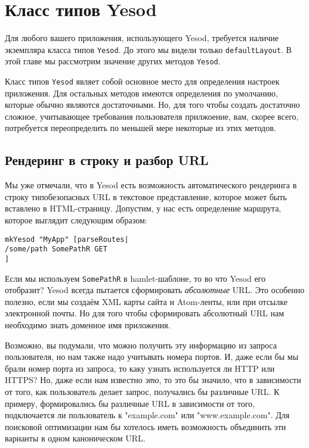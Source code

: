 \chapter {Класс типов Yesod}

Для любого вашего приложения, использующего Yesod, требуется наличие экземпляра класса типов \lstinline'Yesod'. До этого мы видели только \lstinline'defaultLayout'. В этой главе мы рассмотрим значение других методов \lstinline'Yesod'.

Класс типов \lstinline'Yesod' являет собой основное место для определения настроек приложения. Для остальных методов имеются определения по умолчанию, которые обычно являются достаточными. Но, для того чтобы создать достаточно сложное, учитывающее требования пользователя прилжоение, вам, скорее всего, потребуется переопределить по меньшей мере некоторые из этих методов.

\section {Рендеринг в строку и разбор URL}

Мы уже отмечали, что в Yesod есть возможность автоматического рендеринга в строку типобезопасных URL в текстовое представление, которое может быть вставлено в HTML-страницу. Допустим, у нас есть определение маршрута, которое выглядит следующим образом:

\begin{lstlisting}
mkYesod "MyApp" [parseRoutes|
/some/path SomePathR GET
]
\end{lstlisting}

Если мы используем \lstinline'SomePathR' в hamlet-шаблоне, то во что Yesod его отобразит? Yesod всегда пытается сформировать \emph{абсолютные} URL. Это особенно полезно, если мы создаём XML карты сайта и Atom-ленты, или при отсылке электронной почты. Но для того чтобы сформировать абсолютный URL нам необходимо знать доменное имя приложения.

Возможно, вы подумали, что можно получить эту информацию из запроса пользователя, но нам также надо учитывать номера портов. И, даже если бы мы брали номер порта из запроса, то каку узнать используется ли HTTP или HTTPS? Но, даже если нам известно \emph{это}, то это бы значило, что в зависимости от того, как пользователь делает запрос, получались бы различные URL. К примеру, формировались бы различные URL в зависимости от того, подключается ли пользователь к "example.com" или "www.example.com". Для поисковой оптимизации нам бы хотелось иметь возможность объединить эти варианты в одном каноническом URL.

